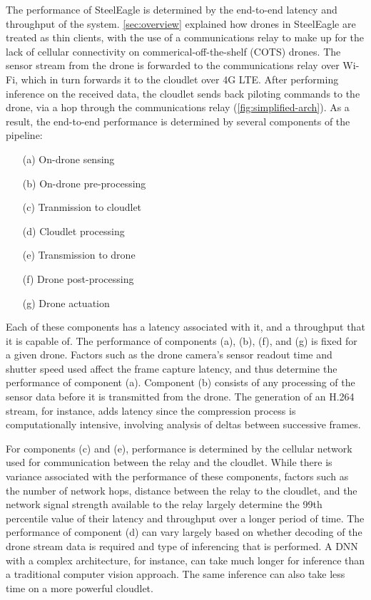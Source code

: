 The performance of SteelEagle is determined by the end-to-end latency and
throughput of the system. \cref{sec:overview} explained how drones in
SteelEagle are treated as thin clients, with the use of a communications relay
to make up for the lack of cellular connectivity on commerical-off-the-shelf
(COTS) drones. The sensor stream from the drone is forwarded to the
communications relay over Wi-Fi, which in turn forwards it to the cloudlet over
4G LTE. After performing inference on the received data, the cloudlet sends
back piloting commands to the drone, via a hop through the communications relay
(\cref{fig:simplified-arch}). As a result, the end-to-end performance is
determined by several components of the pipeline:
\begin{enumerate}
    \item[(a)] On-drone sensing
    \item[(b)] On-drone pre-processing
    \item[(c)] Tranmission to cloudlet
    \item[(d)] Cloudlet processing
    \item[(e)] Transmission to drone
    \item[(f)] Drone post-processing
    \item[(g)] Drone actuation
\end{enumerate}

Each of these components has a latency associated with it, and a throughput
that it is capable of. The performance of components (a), (b), (f), and (g) is
fixed for a given drone. Factors such as the drone camera's sensor readout time
and shutter speed used affect the frame capture latency, and thus determine the
performance of component (a). Component (b) consists of any processing of the
sensor data before it is transmitted from the drone. The generation of an H.264
stream, for instance, adds latency since the compression process is
computationally intensive, involving analysis of deltas between successive
frames.

For components (c) and (e), performance is determined by the cellular network
used for communication between the relay and the cloudlet. While there is
variance associated with the performance of these components, factors such as
the number of network hops, distance between the relay to the cloudlet, and the
network signal strength available to the relay largely determine the 99th
percentile value of their latency and throughput over a longer period of time.
The performance of component (d) can vary largely based on whether decoding of
the drone stream data is required and type of inferencing that is performed. A
DNN with a complex architecture, for instance, can take much longer for
inference than a traditional computer vision approach. The same inference can
also take less time on a more powerful cloudlet.

